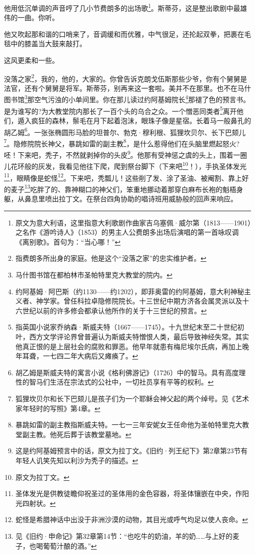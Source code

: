 \par 他用低沉单调的声音哼了几小节费朗多的出场歌\footnote{原文为意大利语，这里指意大利歌剧作曲家吉乌塞佩·威尔第（1813——1901）之名作《游吟诗人》（1853）的男主人公费朗多出场后演唱的第一首咏叹调《离别歌》。首句为：“当心哪！”}。斯蒂芬，这是整出歌剧中最雄伟的一曲。你听。
\par 他又吹起那和谐的口哨来了，音调缓和而优雅，中气很足，还抡起双拳，把裹在毛毯中的膝盖当大鼓来敲打。
\par 这风更柔和一些。
\par 没落之家\footnote{指费朗多所出身的家庭。他是这个“没落之家”的忠实维护者。}，我的，他的，大家的。你曾告诉克朗戈伍斯那些少爷，你有个舅舅是法官，还有个舅舅是将军。斯蒂芬，别再来这一套啦。美并不在那里。也不在马什图书馆\footnote{马什图书馆在都柏林市圣帕特里克大教堂的院内。}那空气污浊的小单间里。你在那儿读过约阿基姆院长\footnote{约阿基姆·阿巴斯（约1130——约1202），即菲奥雷的约阿基姆，意大利神秘主义者、神学家。曾任科拉卓隐修院院长。十三世纪中期方济各会属灵派以及十六世纪以前的许多修会都承认他所作的关于十三世纪的预言。}那褪了色的预言书。是为谁写的?为大教堂院内那长了一百个头的乌合之众。一个憎恶同类者\footnote{指英国小说家乔纳森·斯威夫特（1667——1745）。十九世纪末至二十世纪初叶，西方文学评论界曾普遍认为斯威夫特憎恨人类，最后导致神经失常。其实他真正恨的是上层社会的腐败和罪恶。他早年就患有梅尼埃尔氏病，再加上晚年耳聋，一七四二年大病后又瘫痪了。}离开他们，遁入疯狂的森林，鬃毛在月下起着泡沫，眼珠子像是星宿。长着马一般鼻孔的胡乙姆\footnote{胡乙姆是斯威夫特的寓言小说《格利佛游记》（1726）中的智马。具有高度理性的智马们生活在宗法式的公社中，一切社员享有平等的权利。}。一张张椭圆形马脸的坦普尔、勃克·穆利根、狐狸坎贝尔、长下巴颏儿\footnote{狐狸坎贝尔和长下巴颏儿是孩子们为一个耶稣会神父起的两个绰号。见《艺术家年轻时的写照》第4章。}。隐修院院长神父，暴跳如雷的副主教\footnote{暴跳如雷的副主教指斯威夫特。一七一三年安妮女王任命他为圣帕特里克大教堂副主教。他死后葬于该教堂墓地。}，是什么惹得他们在头脑里燃起怒火?呸！下来吧，秃子，不然就剥掉你的头皮\footnote{这是约阿基姆预言中的话，原文为拉丁文。《旧约·列王纪下》第2章第23节有年轻人讥笑先知以利沙为秃子的描述。}。他那有受神惩之虞的头上，围着一圈儿花环般的灰发，我看见他往下爬，爬到祭台脚下（下来吧\footnote{原文为拉丁文。}！），手执圣体发光\footnote{圣体发光是供教徒瞻仰祝圣过的圣体用的金色容器，将圣体镶嵌在中央，作阳光四射状。}，眼睛像是蛇怪\footnote{蛇怪是希腊神话中出没于非洲沙漠的动物，其目光或呼气均足以使人丧命。}。下来吧，秃瓢儿！这些削了发、涂了圣油、被阉割、靠上好的麦子\footnote{见《旧约·申命记》第32章第14节：“也吃牛的奶油，羊的奶……与上好的麦子，也喝葡萄汁酿的酒。”}吃胖了的、靠神糊口的神父们，笨重地挪动着那穿白麻布长袍的魁梧身躯，从鼻息里喷出拉丁文。在祭台四角协助的唱诗班用威胁般的回声来响应。
